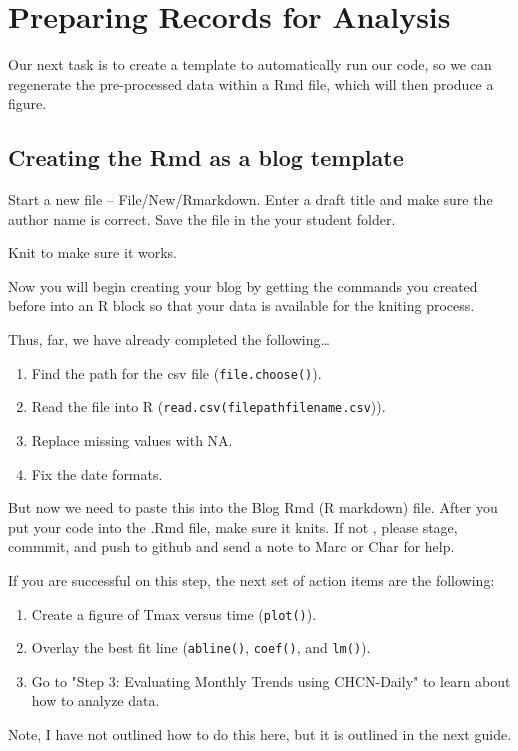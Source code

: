 \documentclass{article}\usepackage[]{graphicx}\usepackage[]{color}
\begin{document}





\section{Preparing Records for Analysis}

Our next task is to create a template to automatically run our code, so we can regenerate the pre-processed data within a Rmd file, which will then produce a figure. 

\subsection{Creating the Rmd as a blog template}

Start a new file -- File/New/Rmarkdown. Enter a draft title and make sure the author name is correct. Save the file in the your student folder. 

Knit to make sure it works. 

Now you will begin creating your blog by getting the commands you created before into an R block so that your data is available for the kniting process.

Thus, far, we have already completed the following\ldots

\begin{enumerate}
  \item Find the path for the csv file (\texttt{file.choose()}).
  \item Read the file into R (\texttt{read.csv(filepathfilename.csv})).
  \item Replace missing values with NA.
  \item Fix the date formats.
\end{enumerate}

But now we need to paste this into the Blog Rmd (R markdown) file. After you put your code into the .Rmd file, make sure it knits. If not , please stage, commmit, and push to github and send a note to Marc or Char for help. 

If you are successful on this step, the next set of action items are the following: 

\begin{enumerate}
  \item Create a figure of Tmax versus time (\texttt{plot()}).
  \item Overlay the best fit line (\texttt{abline()}, \texttt{coef()}, and \texttt{lm()}).
  \item Go to "Step 3: Evaluating Monthly Trends using CHCN-Daily" to learn about how to analyze data.
\end{enumerate}

Note, I have not outlined how to do this here, but it is outlined in the next guide. 
\end{document}
